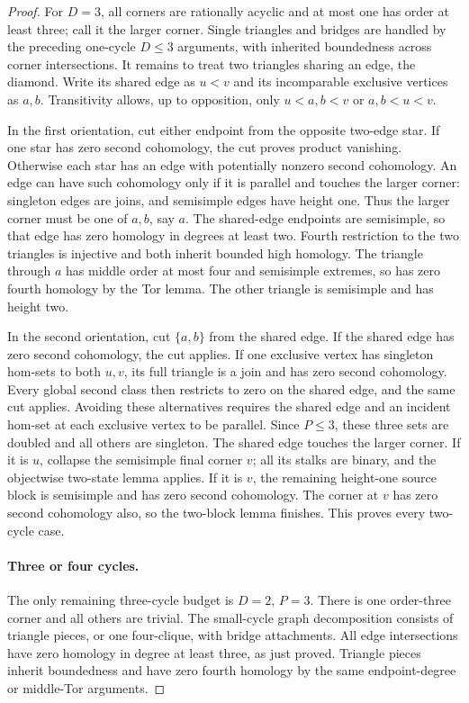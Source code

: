 \begin{proof}
For $D=3$, all corners are rationally acyclic and at most
one has order at least three; call it the larger corner.
Single triangles and bridges are handled by the preceding
one-cycle $D\leq3$ arguments, with inherited boundedness
across corner intersections.  It remains to treat two
triangles sharing an edge, the diamond.  Write its shared
edge as $u<v$ and its incomparable exclusive vertices as
$a,b$.  Transitivity allows, up to opposition, only
$u<a,b<v$ or $a,b<u<v$.

In the first orientation, cut either endpoint from the
opposite two-edge star.  If one star has zero second
cohomology, the cut proves product vanishing.  Otherwise
each star has an edge with potentially nonzero second
cohomology.  An edge can have such cohomology only if
it is parallel and touches the larger corner: singleton
edges are joins, and semisimple edges have height one.
Thus the larger corner must be one of $a,b$, say $a$.
The shared-edge endpoints are semisimple, so that edge
has zero homology in degrees at least two.  Fourth
restriction to the two triangles is injective and both
inherit bounded high homology.  The triangle through $a$
has middle order at most four and semisimple extremes,
so has zero fourth homology by the Tor lemma.  The other
triangle is semisimple and has height two.

In the second orientation, cut $\{a,b\}$ from the shared
edge.  If the shared edge has zero second cohomology,
the cut applies.  If one exclusive vertex has singleton
hom-sets to both $u,v$, its full triangle is a join and
has zero second cohomology.  Every global second class
then restricts to zero on the shared edge, and the same
cut applies.  Avoiding these alternatives requires the
shared edge and an incident hom-set at each exclusive
vertex to be parallel.  Since $P\leq3$, these three sets
are doubled and all others are singleton.  The shared
edge touches the larger corner.  If it is $u$, collapse
the semisimple final corner $v$; all its stalks are binary,
and the objectwise two-state lemma applies.  If it is
$v$, the remaining height-one source block is semisimple
and has zero second cohomology.  The corner at $v$ has
zero second cohomology also, so the two-block lemma
finishes.  This proves every two-cycle case.

\paragraph{Three or four cycles.}
The only remaining three-cycle budget is $D=2$, $P=3$.
There is one order-three corner and all others are trivial.
The small-cycle graph decomposition consists of triangle
pieces, or one four-clique, with bridge attachments.
All edge intersections have zero homology in degree at
least three, as just proved.  Triangle pieces inherit
boundedness and have zero fourth homology by the same
endpoint-degree or middle-Tor arguments.


\end{proof}
